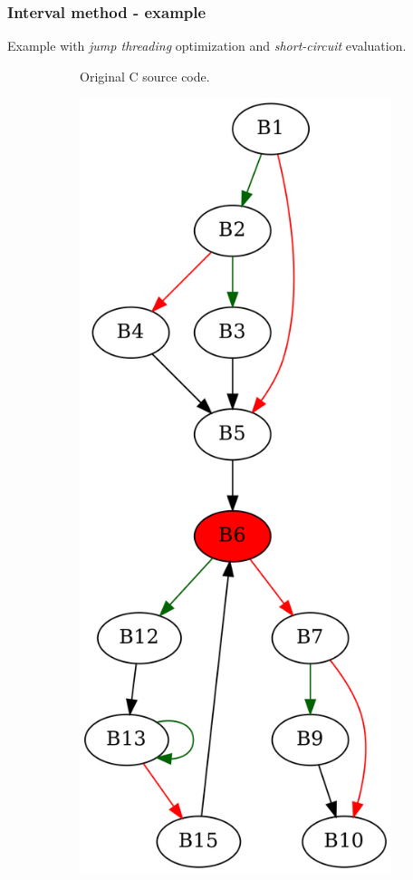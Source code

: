 \documentclass[aspectratio=1610]{beamer}
\begin{document}
\begin{frame}[noframenumbering]
	\frametitle{Interval method - example}
	Example with \textit{jump threading} optimization and \textit{short-circuit} evaluation.
	\begin{figure}[htbp]
		\centering
		\begin{subfigure}[b]{0.30\textwidth}
			\centering
			
			\caption{Original C source code.}
		\end{subfigure}
		\begin{subfigure}[b]{0.50\textwidth}
			\centering
			\includegraphics[height=0.6\paperheight]{inc/methods/interval/example/sample/f_0003b.png}

\end{subfigure}
\end{figure}
\end{frame}
\end{document}
